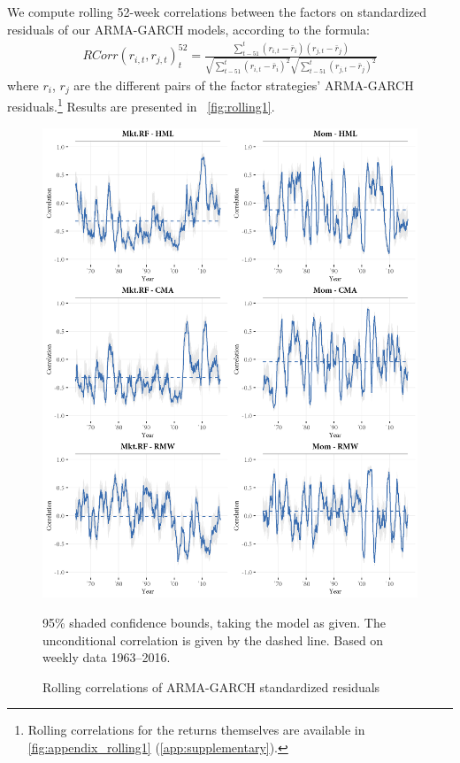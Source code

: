 We compute rolling 52-week correlations between the factors on standardized residuals of our ARMA-GARCH models, according to the formula: 
\begin{align}
    RCorr(r_{i, t}, r_{j, t})_t^{52} = \frac{\sum^{t}_{t-51}(r_{i, t} - \bar{r}_i)(r_{j,t} - \bar{r}_j)}{\sqrt{\sum^{t}_{t-51} (r_{i,t} - \bar{r}_i)^2} \sqrt{\sum^{t}_{t-51} (r_{j,t} - \bar{r}_j)^2}}
\end{align}
where $r_i$, $r_j$ are the different pairs of the factor strategies' ARMA-GARCH residuals.\footnote{Rolling correlations for the returns themselves are available in \autoref{fig:appendix_rolling1} (\autoref{app:supplementary}).} Results are presented in ~\autoref{fig:rolling1}.
\begin{figure}[!p]
  \centering
  \includegraphics[scale=1]{graphics/rolling1.png}
  \footnotesize
  \caption{Rolling correlations of ARMA-GARCH standardized residuals}
  \begin{longcaption}
    95\% shaded confidence bounds, taking the model as given. The unconditional correlation is given by the dashed line. Based on weekly data 1963--2016.
  \end{longcaption}
  \label{fig:rolling1}
\end{figure}
